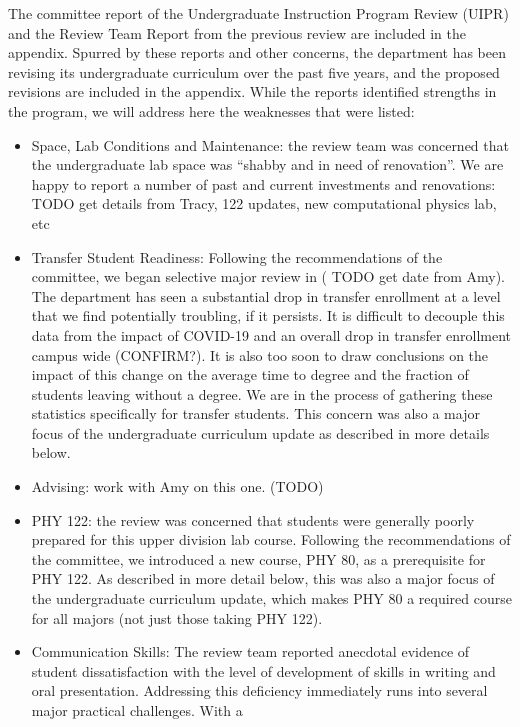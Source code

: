 \documentclass[12pt]{article}
\begin{document}
\noindent
The committee report of the Undergraduate Instruction Program Review
(UIPR) and the Review Team Report from the previous review are
included in the appendix.  Spurred by these reports and other
concerns, the department has been revising its undergraduate curriculum
over the past five years, and the proposed revisions are included in
the appendix. While the reports identified strengths in
the program, we will address here the weaknesses that were listed:
\begin{itemize}
\item Space, Lab Conditions and Maintenance:  the review team was concerned that the undergraduate lab space was ``shabby and in need of renovation''.  We are happy to report a number of past and current investments and renovations:  {\color{red}TODO get details from Tracy, 122 updates, new computational physics lab, etc}
\item Transfer Student Readiness: Following the recommendations of the
  committee, we began selective major review in ({\color{red} TODO get date from
  Amy}).  The department has seen a substantial drop in transfer
  enrollment at a level that we find potentially troubling, if it
  persists.  It is difficult to decouple this data from the impact of COVID-19
  and an overall drop in transfer enrollment campus wide ({\color{red}CONFIRM?}).
  It is also too soon to draw conclusions on the impact of this
  change on the average time to degree and the fraction of students
  leaving without a degree.  We are in the process of gathering these
  statistics specifically for transfer students.  This concern was
  also a major focus of the undergraduate curriculum update as
  described in more details below.
\item {\color{red} Advising:  work with Amy on this one. (TODO)}
\item PHY 122: the review was concerned that students were generally
  poorly prepared for this upper division lab course.  Following the
  recommendations of the committee, we introduced a new course, PHY
  80, as a prerequisite for PHY 122.  As described in more detail
  below, this was also a major focus of the undergraduate curriculum
  update, which makes PHY 80 a required course for all majors (not
  just those taking PHY 122).
\item Communication Skills: The review team reported anecdotal
  evidence of student dissatisfaction with the level of development of
  skills in writing and oral presentation.  Addressing this deficiency
  immediately runs into several major practical challenges.  With a

\end{itemize}
\end{document}

